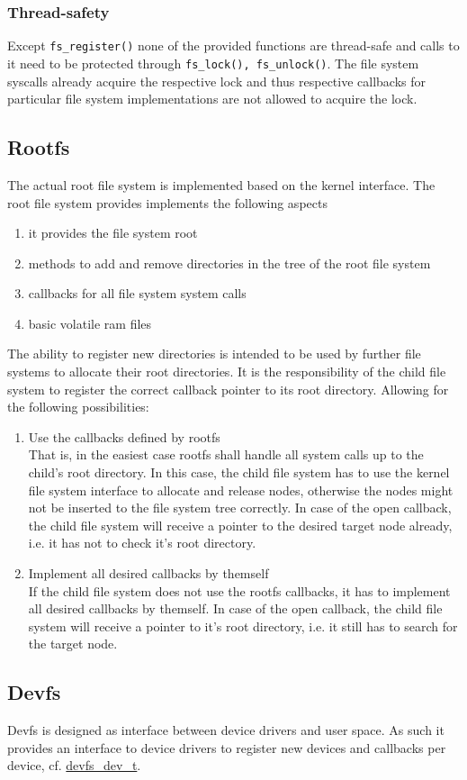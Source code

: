 		\subsubsection{Thread-safety}
			Except \lstinline{fs_register()} none of the provided functions are thread-safe and calls to it need to be protected through \lstinline{fs_lock(), fs_unlock()}. The file system syscalls already acquire the respective lock and thus respective callbacks for particular file system implementations are not allowed to acquire the lock.

	\subsection{Rootfs}
		The actual root file system is implemented based on the kernel interface. The root file system provides implements the following aspects
		\begin{enumerate}
			\item it provides the file system root
			\item methods to add and remove directories in the tree of the root file system
			\item callbacks for all file system system calls
			\item basic volatile ram files
		\end{enumerate}

		The ability to register new directories is intended to be used by further file systems to allocate their root directories. It is the responsibility of the child file system to register the correct callback pointer to its root directory. Allowing for the following possibilities:
		\begin{enumerate}
			\item Use the callbacks defined by rootfs\\
				That is, in the easiest case rootfs shall handle all system calls up to the child's root directory. In this case, the child file system has to use the kernel file system interface to allocate and release nodes, otherwise the nodes might not be inserted to the file system tree correctly.
				In case of the open callback, the child file system will receive a pointer to the desired target node already, i.e. it has not to check it's root directory.

			\item Implement all desired callbacks by themself\\
				 If the child file system does not use the rootfs callbacks, it has to implement all desired callbacks by themself.
				 In case of the open callback, the child file system will receive a pointer to it's root directory, i.e. it still has to search for the target node.
		\end{enumerate}
		
	\subsection{Devfs}
		Devfs is designed as interface between device drivers and user space. As such it provides an interface to device drivers to register new devices and callbacks per device, cf. \hyperref[structdevfs__dev__t]{devfs\_dev\_t}.
